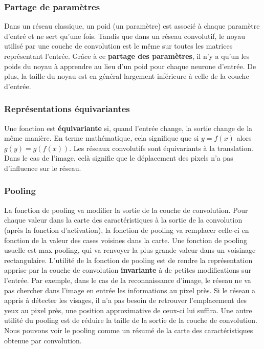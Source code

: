 \documentclass[11pt]{article}
\begin{document}
\subsubsection{Partage de paramètres}
\label{sec:orgbaf791b}
Dans un réseau classique, un poid (un paramètre) est associé à chaque paramètre d'entré et ne sert qu'une fois.
Tandis que dans un réseau convolutif, le noyau utilisé par une couche de convolution est le même sur toutes les matrices représentant l'entrée. 
Grâce à ce \textbf{partage des paramètres}, il n'y a qu'un les poids du noyau à apprendre au lieu d'un poid pour chaque neurone d'entrée.
De plus, la taille du noyau est en général largement inférieure à celle de la couche d'entrée.

\subsubsection{Représentations équivariantes}
\label{sec:orgcc3b14a}
Une fonction est \textbf{équivariante} si, quand l'entrée change, la sortie change de la même manière.
En terme mathématique, cela signifique que si \(y = f(x)\) alors \(g(y) = g(f(x))\). 
Les réseaux convolutifs sont équivariants à la translation. 
Dans le cas de l'image, celà signifie que le déplacement des pixels n'a pas d'influence sur le réseau.

\subsubsection{Pooling}
\label{sec:org3f15550}
La fonction de pooling va modifier la sortie de la couche de convolution.
Pour chaque valeur dans la carte des caractéristiques à la sortie de la convolution (après la fonction d'activation), la fonction de pooling va remplacer celle-ci en fonction de la valeur des cases voisines dans la carte.
Une fonction de pooling usuelle est max pooling, qui va renvoyer la plus grande valeur dans un voisinage rectangulaire.
L'utilité de la fonction de pooling est de rendre la représentation apprise par la couche de convolution \textbf{invariante} à de petites modifications sur l'entrée.
Par exemple, dans le cas de la reconnaissance d'image, le réseau ne va pas chercher dans l'image en entrée les informations au pixel près.
Si le réseau a appris à détecter les visages, il n'a pas besoin de retrouver l'emplacement des yeux au pixel près, une position approximative de ceux-ci lui suffira.
Une autre utilité du pooling est de réduire la taille de la sortie de la couche de convolution.
Nous pouvons voir le pooling comme un résumé de la carte des caractéristiques obtenue par convolution.
\end{document}
